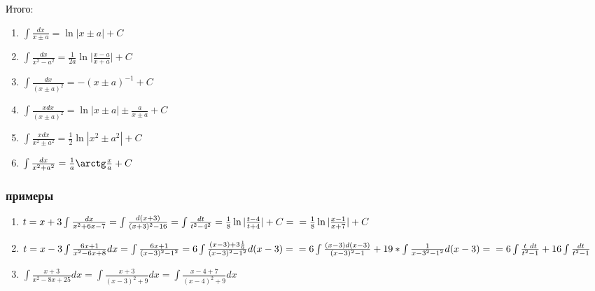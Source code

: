 \documentclass[12pt,a4paper]{article}
\begin{document}
Итого:
\begin{enumerate}[leftmargin=*, itemsep=0.4ex, before={\everymath{\displaystyle}}]%
\item{
$
\int \frac{dx}{x \pm a} =
\ln |x \pm a| + C
$
}
\item{
$
\int \frac{dx}{x^2 - a^2} =
\frac{1}{2a} \ln \big| \frac{x - a}{x + a} \big| + C
$
}
\item{
$
\int \frac{dx}{(x \pm a)^2} =
-(x \pm a)^{-1} + C
$
}
\item{
$
\int \frac{xdx}{(x \pm a)^2} =
\ln |x \pm a| \pm \frac{a}{x \pm a} + C
$
}
\item{
$
\int \frac{xdx}{x^2 \pm a^2} =
\frac{1}{2} \ln |x^2 \pm a^2| + C
$
}
\item{
$
\int \frac{dx}{x^2 + a^2} =
\frac{1}{a} \arctg \frac{x}{a} + C
$
}
\end{enumerate}
\subsubsection{примеры}
\begin{enumerate}[leftmargin=*, itemsep=0.9ex, before={\everymath{\displaystyle}}]%
\item{
$
t = x + 3\\
\int \frac{dx}{x^2 + 6x - 7} =
\int \frac{d(x + 3)}{(x + 3)^2 - 16} =
\int \frac{dt}{t^2 - 4^2} =
\frac{1}{8} \ln |\frac{t - 4}{t + 4}| + C =\\
= \frac{1}{8} \ln |\frac{x - 1}{x + 7}| + C\\
$
}
\item{
$
t = x - 3\\
\int \frac{6x + 1}{x^2 - 6x + 8} dx =
\int \frac{6x + 1}{(x - 3)^2 - 1^2} =
6\int \frac{(x - 3) + 3\frac{1}{6}}{(x - 3)^2 - 1^2} d(x - 3) =\\
= 6\int \frac{(x - 3)d(x - 3)}{(x - 3)^2 - 1} + 19 *
\int \frac{1}{x - 3^2 - 1^2}d(x - 3) =\\
= 6 \int \frac{t\ dt}{t^2 - 1} + 16 \int \frac{dt}{t^2 - 1}
$
}
\item{
$
\int \frac{x + 3}{x^2 - 8x + 25} dx =
\int \frac{x + 3}{(x - 3)^2 + 9} dx =
\int \frac{x - 4 + 7}{(x - 4)^2 + 9} dx
$
}
\end{enumerate}
\end{document}
